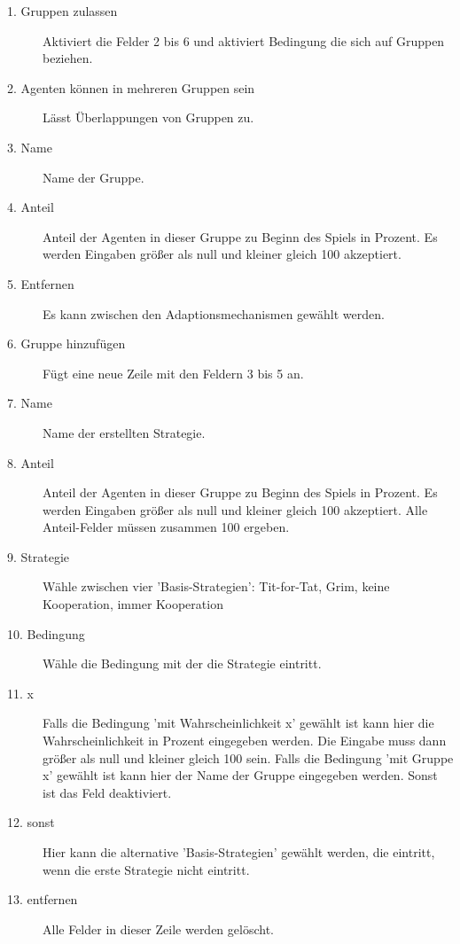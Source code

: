 \begin{description}

\item[1. Gruppen zulassen] Aktiviert die Felder 2 bis 6 und aktiviert Bedingung die sich auf Gruppen beziehen.

\item[2. Agenten können in mehreren Gruppen sein] Lässt Überlappungen von Gruppen zu.

\item[3. Name] Name der Gruppe.

\item[4. Anteil] Anteil der Agenten in dieser Gruppe zu Beginn des Spiels in Prozent. Es werden Eingaben größer als null und kleiner gleich 100 akzeptiert.

\item[5. Entfernen] Es kann zwischen den Adaptionsmechanismen gewählt werden.

\item[6. Gruppe hinzufügen] Fügt eine neue Zeile mit den Feldern 3 bis 5 an.

\item[7. Name] Name der erstellten Strategie.

\item[8. Anteil] Anteil der Agenten in dieser Gruppe zu Beginn des Spiels in Prozent. Es werden Eingaben größer als null und kleiner gleich 100 akzeptiert. Alle Anteil-Felder müssen zusammen 100 ergeben.

\item[9. Strategie] Wähle zwischen vier 'Basis-Strategien': Tit-for-Tat, Grim, keine Kooperation, immer Kooperation

\item[10. Bedingung] Wähle die Bedingung mit der die Strategie eintritt. 

\item[11. x] Falls die Bedingung 'mit Wahrscheinlichkeit x' gewählt ist kann hier die Wahrscheinlichkeit in Prozent eingegeben werden. Die Eingabe muss dann größer als null und kleiner gleich 100 sein. Falls die Bedingung 'mit Gruppe x' gewählt ist kann hier der Name der Gruppe eingegeben werden. Sonst ist das Feld deaktiviert.

\item[12. sonst] Hier kann die alternative 'Basis-Strategien' gewählt werden, die eintritt, wenn die erste Strategie nicht eintritt.

\item[13. entfernen] Alle Felder in dieser Zeile werden gelöscht.


\end{description}
